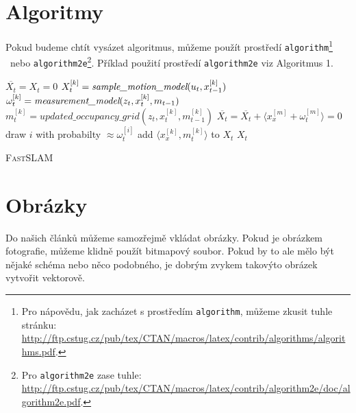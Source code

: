 \documentclass[11pt, a4paper]{article}
\begin{document}
\section{Algoritmy}\label{alg}
Pokud budeme chtít vysázet algoritmus, můžeme použít prostředí \verb|algorithm|\footnote{Pro nápovědu, jak zacházet s prostředím \verb|algorithm|, můžeme zkusit tuhle stránku: \\ \url{http://ftp.cstug.cz/pub/tex/CTAN/macros/latex/contrib/algorithms/algorithms.pdf}.} \ nebo \verb|algorithm2e|\footnote{Pro \verb|algorithm2e| zase tuhle: \url{http://ftp.cstug.cz/pub/tex/CTAN/macros/latex/contrib/algorithm2e/doc/algorithm2e.pdf}.}. Příklad použití prostředí \verb|algorithm2e| viz Algoritmus 1. \par
\vspace{1em}

\begin{algorithm}
\DontPrintSemicolon
{}
\SetNlSty{}{}{:}
\SetNlSkip{-1em}

\BlankLine
\Indp \Indp

$\overline{X_t} = X_t = 0$\;
{
	$X_t^{[k]} =  \emph{sample\_motion\_model}(u_t, x_{t-1}^{[k]} )$\;
	$\omega_t^{[k]} = \emph{measurement\_model}(z_t, x_t^{[k]}, m_{t-1})$\;
	$m_t^{[k]} = updated\_occupancy\_grid (z_t, x_t^{[k]}, m_{t-1}^{[k]} )$ \;
	$\overline{X_t} = \overline{X_t} + \langle x_x^{[m]} +  \omega_t^{[m]} \rangle = 0$\;	
}
{
	draw $i$ with probabilty $\approx \omega_t^{[i]}$ \;
	add $\langle x_x^{[k]}, m_t^{[k]} \rangle$ to $X_t$ \;
}
\Return $X_t$	
\caption{\textsc{FastSLAM}}\label{FAST}
\end{algorithm}

\section{Obrázky}
Do našich článků můžeme samozřejmě vkládat obrázky. Pokud je obrázkem fotografie, můžeme klidně použít bitmapový soubor. Pokud by to ale mělo být nějaké schéma nebo něco podobného, je dobrým zvykem takovýto obrázek vytvořit vektorově. \par
\end{document}
